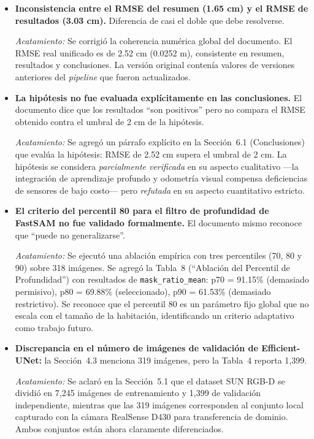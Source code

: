 \documentclass[12pt, a4paper]{article}
\begin{document}
\begin{itemize}[leftmargin=*, itemsep=1em]

\item \textbf{Inconsistencia entre el RMSE del resumen (1.65 cm) y el RMSE de resultados (3.03 cm).} Diferencia de casi el doble que debe resolverse.

\textit{Acatamiento:} Se corrigió la coherencia numérica global del documento. El RMSE real unificado es de 2.52 cm (0.0252 m), consistente en resumen, resultados y conclusiones. La versión original contenía valores de versiones anteriores del \textit{pipeline} que fueron actualizados.

\item \textbf{La hipótesis no fue evaluada explícitamente en las conclusiones.} El documento dice que los resultados ``son positivos'' pero no compara el RMSE obtenido contra el umbral de 2 cm de la hipótesis.

\textit{Acatamiento:} Se agregó un párrafo explícito en la Sección~6.1 (Conclusiones) que evalúa la hipótesis: RMSE de 2.52 cm supera el umbral de 2 cm. La hipótesis se considera \textit{parcialmente verificada} en su aspecto cualitativo —la integración de aprendizaje profundo y odometría visual compensa deficiencias de sensores de bajo costo— pero \textit{refutada} en su aspecto cuantitativo estricto.

\item \textbf{El criterio del percentil 80 para el filtro de profundidad de FastSAM no fue validado formalmente.} El documento mismo reconoce que ``puede no generalizarse''.

\textit{Acatamiento:} Se ejecutó una ablación empírica con tres percentiles (70, 80 y 90) sobre 318 imágenes. Se agregó la Tabla~8 (``Ablación del Percentil de Profundidad'') con resultados de \texttt{mask\_ratio\_mean}: p70 = 91.15\% (demasiado permisivo), p80 = 69.88\% (seleccionado), p90 = 61.53\% (demasiado restrictivo). Se reconoce que el percentil 80 es un parámetro fijo global que no escala con el tamaño de la habitación, identificando un criterio adaptativo como trabajo futuro.

\item \textbf{Discrepancia en el número de imágenes de validación de Efficient-UNet:} la Sección~4.3 menciona 319 imágenes, pero la Tabla~4 reporta 1,399.

\textit{Acatamiento:} Se aclaró en la Sección~5.1 que el dataset SUN RGB-D se dividió en 7,245 imágenes de entrenamiento y 1,399 de validación independiente, mientras que las 319 imágenes corresponden al conjunto local capturado con la cámara RealSense D430 para transferencia de dominio. Ambos conjuntos están ahora claramente diferenciados.


\end{itemize}
\end{document}
